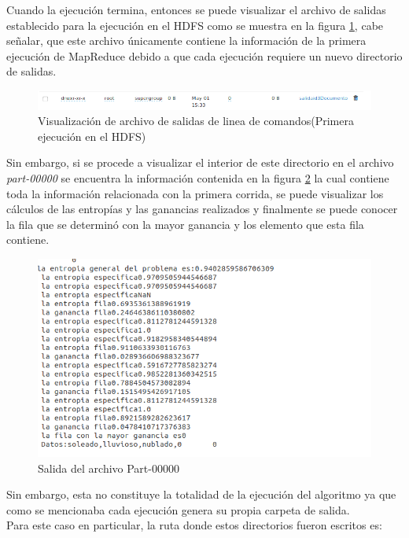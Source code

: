 Cuando la ejecución termina, entonces se puede visualizar el archivo de salidas establecido para la ejecución en el HDFS como se muestra en la figura \ref{fig:ID312}, cabe señalar, que este archivo únicamente contiene la información de la primera ejecución de MapReduce debido a que cada ejecución requiere un nuevo directorio de salidas.
\begin{figure}[H]
	\begin{center}
		\hypertarget{fig:ID312}{\hspace{1pt}}
		\includegraphics[width=.7\textwidth]{capitulo4a/images/ID3_17.png}
		\caption{Visualización de archivo de salidas de linea de comandos(Primera ejecución en el HDFS)}
		\label{fig:ID312}
	\end{center}
\end{figure}
Sin embargo, si se procede a visualizar el interior de este directorio en el archivo \emph{part-00000} se encuentra la información contenida en la figura \ref{fig:ID313} la cual contiene toda la información relacionada con la primera corrida, se puede visualizar los cálculos de las entropías y las ganancias realizados y finalmente se puede conocer la fila que se determinó con la mayor ganancia y los elemento que esta fila contiene.
\begin{figure}[H]
	\begin{center}
		\hypertarget{fig:ID313}{\hspace{1pt}}
		\includegraphics[width=.7\textwidth]{capitulo4a/images/ID3_18.png}
		\caption{Salida del archivo Part-00000}
		\label{fig:ID313}
	\end{center}
\end{figure}
Sin embargo, esta no constituye la totalidad de la ejecución del algoritmo ya que como se mencionaba cada ejecución genera su propia carpeta de salida. 
\\
Para este caso en particular, la ruta donde estos directorios fueron escritos es:
